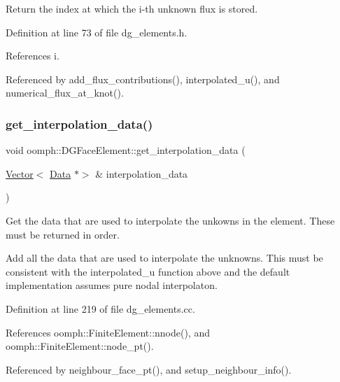 Return the index at which the i-\/th unknown flux is stored. 



Definition at line 73 of file dg\+\_\+elements.\+h.



References i.



Referenced by add\+\_\+flux\+\_\+contributions(), interpolated\+\_\+u(), and numerical\+\_\+flux\+\_\+at\+\_\+knot().

\mbox{\label{classoomph_1_1DGFaceElement_ad0987fa163b40067f8d11c7edaf4af32}} 
\subsubsection{\texorpdfstring{get\+\_\+interpolation\+\_\+data()}{get\_interpolation\_data()}}
{\footnotesize\ttfamily void oomph\+::\+D\+G\+Face\+Element\+::get\+\_\+interpolation\+\_\+data (\begin{DoxyParamCaption}\item[{\hyperlink{classoomph_1_1Vector}{Vector}$<$ \hyperlink{classoomph_1_1Data}{Data} $\ast$$>$ \&}]{interpolation\+\_\+data }\end{DoxyParamCaption})\hspace{0.3cm}{\ttfamily [virtual]}}



Get the data that are used to interpolate the unkowns in the element. These must be returned in order. 

Add all the data that are used to interpolate the unknowns. This must be consistent with the interpolated\+\_\+u function above and the default implementation assumes pure nodal interpolaton. 

Definition at line 219 of file dg\+\_\+elements.\+cc.



References oomph\+::\+Finite\+Element\+::nnode(), and oomph\+::\+Finite\+Element\+::node\+\_\+pt().



Referenced by neighbour\+\_\+face\+\_\+pt(), and setup\+\_\+neighbour\+\_\+info().

